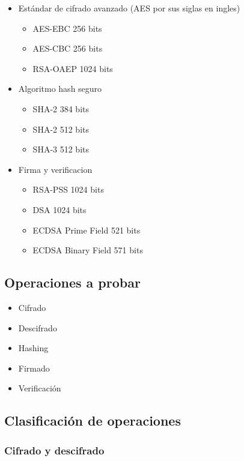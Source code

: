 \documentclass[../main.tex]{subfiles}
\begin{document}
\begin{itemize}
  \item Estándar de cifrado avanzado (AES por sus siglas en ingles)
        \begin{itemize}
          \item AES-EBC 256 bits
          \item AES-CBC 256 bits
          \item RSA-OAEP 1024 bits
        \end{itemize}
  \item Algoritmo hash seguro
        \begin{itemize}
          \item SHA-2 384 bits
          \item SHA-2 512 bits
          \item SHA-3 512 bits
        \end{itemize}
  \item Firma y verificacion
        \begin{itemize}
          \item RSA-PSS 1024 bits
          \item DSA 1024 bits
          \item ECDSA Prime Field 521 bits
          \item ECDSA Binary Field 571 bits
        \end{itemize}
\end{itemize}


\subsection{Operaciones a probar}\label{operaciones-a-probar}

\begin{itemize}
  \item Cifrado
  \item Descifrado
  \item Hashing
  \item Firmado
  \item Verificación
\end{itemize}



\subsection{Clasificación de operaciones}\label{clasificaciuxf2n-de-operaciones}
\subsubsection{Cifrado y descifrado}\label{sec:cifrado-y-descifrado}
\end{document}
